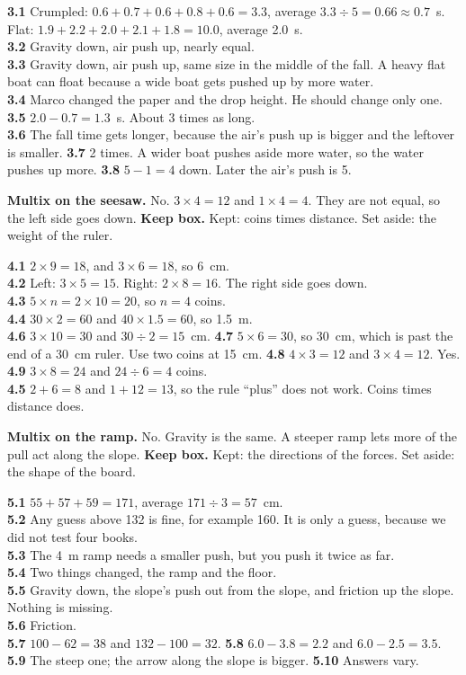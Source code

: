\textbf{3.1} Crumpled: $0.6+0.7+0.6+0.8+0.6=3.3$, average $3.3\div5=0.66\approx0.7$~s. Flat: $1.9+2.2+2.0+2.1+1.8=10.0$, average 2.0~s.\\
\textbf{3.2} Gravity down, air push up, nearly equal.\\
\textbf{3.3} Gravity down, air push up, same size in the middle of the fall. A heavy flat boat can float because a wide boat gets pushed up by more water.\\
\textbf{3.4} Marco changed the paper and the drop height. He should change only one.\\
\textbf{3.5} $2.0-0.7=1.3$~s. About 3 times as long.\\
\textbf{3.6} The fall time gets longer, because the air's push up is bigger and the leftover is smaller. \textbf{3.7} 2 times. A wider boat pushes aside more water, so the water pushes up more. \textbf{3.8} $5-1=4$ down. Later the air's push is 5.

\textbf{Multix on the seesaw.} No. $3\times4=12$ and $1\times4=4$. They are not equal, so the left side goes down. \textbf{Keep box.} Kept: coins times distance. Set aside: the weight of the ruler.

\textbf{4.1} $2\times9=18$, and $3\times6=18$, so 6~cm.\\
\textbf{4.2} Left: $3\times5=15$. Right: $2\times8=16$. The right side goes down.\\
\textbf{4.3} $5\times n=2\times10=20$, so $n=4$ coins.\\
\textbf{4.4} $30\times2=60$ and $40\times1.5=60$, so 1.5~m.\\
\textbf{4.6} $3\times10=30$ and $30\div2=15$~cm. \textbf{4.7} $5\times6=30$, so 30~cm, which is past the end of a 30~cm ruler. Use two coins at 15~cm. \textbf{4.8} $4\times3=12$ and $3\times4=12$. Yes. \textbf{4.9} $3\times8=24$ and $24\div6=4$ coins.\\
\textbf{4.5} $2+6=8$ and $1+12=13$, so the rule ``plus'' does not work. Coins times distance does.

\textbf{Multix on the ramp.} No. Gravity is the same. A steeper ramp lets more of the pull act along the slope. \textbf{Keep box.} Kept: the directions of the forces. Set aside: the shape of the board.

\textbf{5.1} $55+57+59=171$, average $171\div3=57$~cm.\\
\textbf{5.2} Any guess above 132 is fine, for example 160. It is only a guess, because we did not test four books.\\
\textbf{5.3} The 4~m ramp needs a smaller push, but you push it twice as far.\\
\textbf{5.4} Two things changed, the ramp and the floor.\\
\textbf{5.5} Gravity down, the slope's push out from the slope, and friction up the slope. Nothing is missing.\\
\textbf{5.6} Friction.\\
\textbf{5.7} $100-62=38$ and $132-100=32$. \textbf{5.8} $6.0-3.8=2.2$ and $6.0-2.5=3.5$. \textbf{5.9} The steep one; the arrow along the slope is bigger. \textbf{5.10} Answers vary.

